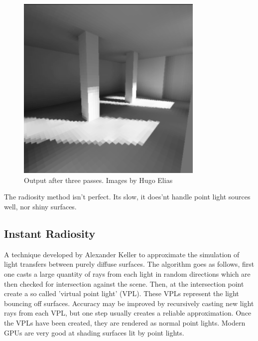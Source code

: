 \begin{figure}[ht]
\begin{minipage}[b]{0.3\linewidth}
\centering
\includegraphics[width=0.8\textwidth]{Media/prev_work_radiosity_thirdpass.png}
\caption{Output after three passes. Images by Hugo Elias \cite{elias} }
\label{fig:radiosity_output}
\end{minipage}
\end{figure}

	

	The radiosity method isn't perfect. Its slow, it does'nt handle point light sources well, nor shiny surfaces.

	\subsection {Instant Radiosity}
		A technique developed by Alexander Keller to approximate the simulation of light
		transfers between purely diffuse surfaces. The algorithm goes as follows, first
		one casts a large quantity of rays from each light in random directions which
		are then checked for intersection against the scene. Then, at the intersection
		point create a so called 'virtual point light' (VPL). These VPLs represent the
		light bouncing off surfaces. Accuracy may be improved by recursively casting new
		light rays from each VPL, but one step usually creates a reliable approximation.
		Once the VPLs have been created, they are rendered as normal point lights.
		Modern GPUs are very good at shading surfaces lit by point lights.

